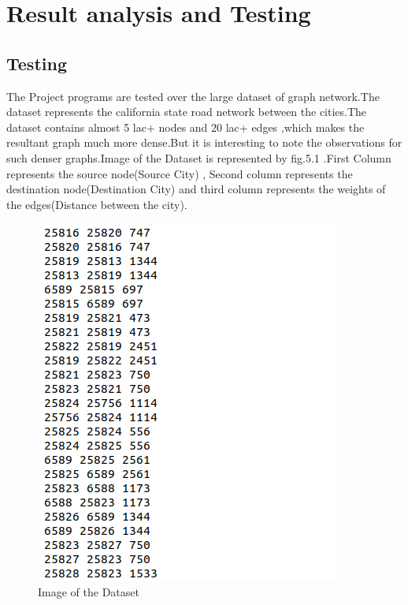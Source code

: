 \documentclass[14pt,a4]{extreport}
\begin{document}
\chapter{Result analysis and Testing}

\section{Testing}
The Project programs are  tested over the large dataset of graph network.The dataset represents the california state road network between the cities.The dataset contains almost 5 lac+ nodes and 20 lac+ edges ,which makes the resultant graph much more dense.But it is interesting to note the observations for such denser graphs.Image of the Dataset is represented by fig.5.1 .First  Column represents the source node(Source City) , Second column represents the destination node(Destination City) and third column represents the weights of the edges(Distance between the city).
\begin{figure}
\includegraphics[]{images/dataset.png}
\caption{Image of the Dataset}
\label{fig:1}
\end{figure}
\end{document}
